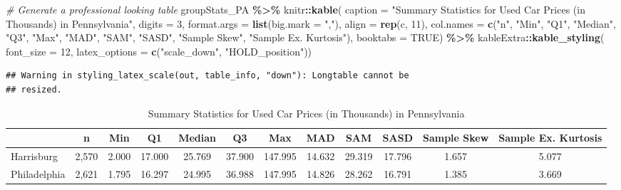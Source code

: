 \documentclass[
]{article}
\newenvironment{Shaded}{\begin{snugshade}}{\end{snugshade}}
\newcommand{\AttributeTok}[1]{\textcolor[rgb]{0.13,0.29,0.53}{#1}}
\newcommand{\CommentTok}[1]{\textcolor[rgb]{0.56,0.35,0.01}{\textit{#1}}}
\newcommand{\ConstantTok}[1]{\textcolor[rgb]{0.56,0.35,0.01}{#1}}
\newcommand{\DecValTok}[1]{\textcolor[rgb]{0.00,0.00,0.81}{#1}}
\newcommand{\FunctionTok}[1]{\textcolor[rgb]{0.13,0.29,0.53}{\textbf{#1}}}
\newcommand{\NormalTok}[1]{#1}
\newcommand{\SpecialCharTok}[1]{\textcolor[rgb]{0.81,0.36,0.00}{\textbf{#1}}}
\newcommand{\StringTok}[1]{\textcolor[rgb]{0.31,0.60,0.02}{#1}}
\begin{document}
\begin{Shaded}
\begin{Highlighting}[]
\CommentTok{\# Generate a professional looking table}
\NormalTok{groupStats\_PA }\SpecialCharTok{\%\textgreater{}\%}
\NormalTok{  knitr}\SpecialCharTok{::}\FunctionTok{kable}\NormalTok{(}
    \AttributeTok{caption =} \StringTok{"Summary Statistics for Used Car Prices (in Thousands) in Pennsylvania"}\NormalTok{,}
    \AttributeTok{digits =} \DecValTok{3}\NormalTok{,}
    \AttributeTok{format.args =} \FunctionTok{list}\NormalTok{(}\AttributeTok{big.mark =} \StringTok{","}\NormalTok{),}
    \AttributeTok{align =} \FunctionTok{rep}\NormalTok{(}\StringTok{\textquotesingle{}c\textquotesingle{}}\NormalTok{, }\DecValTok{11}\NormalTok{),}
    \AttributeTok{col.names =} \FunctionTok{c}\NormalTok{(}\StringTok{"n"}\NormalTok{, }\StringTok{"Min"}\NormalTok{, }\StringTok{"Q1"}\NormalTok{, }\StringTok{"Median"}\NormalTok{, }\StringTok{"Q3"}\NormalTok{, }\StringTok{"Max"}\NormalTok{, }\StringTok{"MAD"}\NormalTok{, }\StringTok{"SAM"}\NormalTok{, }\StringTok{"SASD"}\NormalTok{,}
    \StringTok{"Sample Skew"}\NormalTok{, }\StringTok{"Sample Ex. Kurtosis"}\NormalTok{),}
  \AttributeTok{booktabs =} \ConstantTok{TRUE}\NormalTok{) }\SpecialCharTok{\%\textgreater{}\%}
\NormalTok{  kableExtra}\SpecialCharTok{::}\FunctionTok{kable\_styling}\NormalTok{(}
  \AttributeTok{font\_size =} \DecValTok{12}\NormalTok{,}
  \AttributeTok{latex\_options =} \FunctionTok{c}\NormalTok{(}\StringTok{"scale\_down"}\NormalTok{, }\StringTok{"HOLD\_position"}\NormalTok{))}
\end{Highlighting}
\end{Shaded}

\begin{verbatim}
## Warning in styling_latex_scale(out, table_info, "down"): Longtable cannot be
## resized.
\end{verbatim}

\begingroup\fontsize{12}{14}\selectfont

\begin{longtable}[t]{lccccccccccc}
\caption{\label{tab:unnamed-chunk-12}Summary Statistics for Used Car Prices (in Thousands) in Pennsylvania}\\
\toprule
 & n & Min & Q1 & Median & Q3 & Max & MAD & SAM & SASD & Sample Skew & Sample Ex. Kurtosis\\
\midrule
Harrisburg & 2,570 & 2.000 & 17.000 & 25.769 & 37.900 & 147.995 & 14.632 & 29.319 & 17.796 & 1.657 & 5.077\\
Philadelphia & 2,621 & 1.795 & 16.297 & 24.995 & 36.988 & 147.995 & 14.826 & 28.262 & 16.791 & 1.385 & 3.669\\
\bottomrule
\end{longtable}
\endgroup{}
\end{document}
